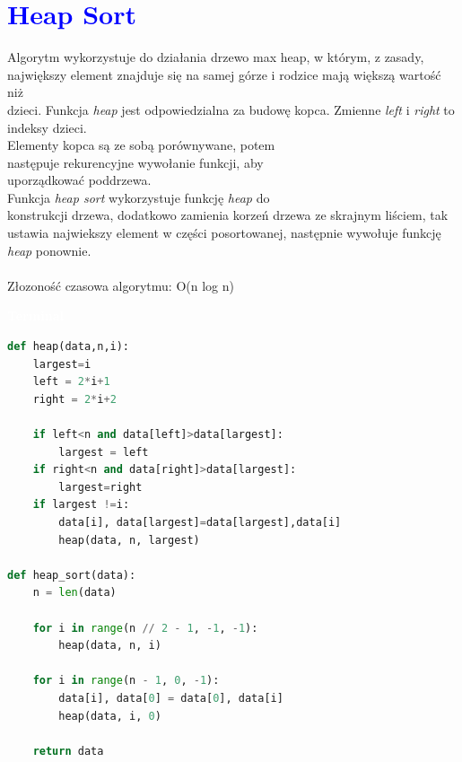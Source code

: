 \documentclass{article}
\begin{document}
	\newpage
	
	\section*{\textcolor{blue}{Heap Sort}}
	\begin{multicols}{2}
		\noindent Algorytm wykorzystuje do działania drzewo max heap, w którym, z zasady, największy element znajduje się na samej górze i rodzice mają większą wartość niż \\dzieci. Funkcja \textit{heap} jest odpowiedzialna za budowę kopca. Zmienne \textit{left} i \textit{right} to indeksy dzieci. \\Elementy kopca są ze sobą porównywane, potem \\następuje rekurencyjne wywołanie funkcji, aby \\uporządkować poddrzewa. \\
		Funkcja \textit{heap sort} wykorzystuje funkcję \textit{heap} do \\konstrukcji drzewa, dodatkowo zamienia korzeń drzewa ze skrajnym liściem, tak ustawia najwiekszy element w części posortowanej, następnie wywołuje funkcję \textit{heap} ponownie.\\ \\Złozoność czasowa algorytmu: O(n log n)
		
		\noindent 
		\begin{tcolorbox}[colback=black,colframe=gray!50!,arc=3mm,boxrule=0pt,left=0pt,right=0pt,width=\linewidth]
			\textcolor{white}{\textbf{\textsf{Terminal}}}\\
			
			\begin{lstlisting}[language=Python]
def heap(data,n,i):
	largest=i
	left = 2*i+1
	right = 2*i+2

	if left<n and data[left]>data[largest]:
		largest = left
	if right<n and data[right]>data[largest]:
		largest=right
	if largest !=i:
		data[i], data[largest]=data[largest],data[i]
		heap(data, n, largest)

def heap_sort(data):
	n = len(data)

	for i in range(n // 2 - 1, -1, -1):  
		heap(data, n, i)

	for i in range(n - 1, 0, -1):
		data[i], data[0] = data[0], data[i]
		heap(data, i, 0)

	return data
			\end{lstlisting}
			
		\end{tcolorbox}
	\end{multicols}
	
\end{document}

